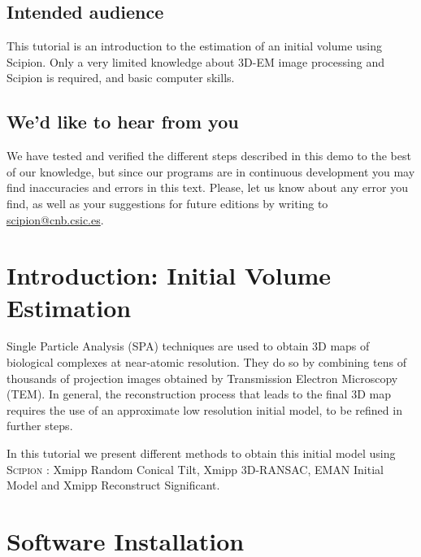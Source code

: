 \documentclass[12pt]{article} %
\newcommand{\scipion}{\textsc{Scipion} }
\begin{document}



\subsection*{Intended audience}

This tutorial is an introduction to the estimation of an initial
volume using Scipion.  Only a very limited knowledge about 3D-EM image
processing and Scipion is required, and basic computer skills.

\subsection*{We'd like to hear from you}

We have tested and verified the different steps described in this demo
to the best of our knowledge, but since our programs are in continuous
development you may find inaccuracies and errors in this text. Please,
let us know about any error you find, as well as your suggestions for
future editions by writing to
\href{mailto:scipion@cnb.csic.es}{scipion@cnb.csic.es}.

\newpage


\tableofcontents %

\newpage

\section{Introduction: Initial Volume Estimation}

Single Particle Analysis (SPA) techniques are used to obtain 3D maps
of biological complexes at near-atomic resolution. They do so by
combining tens of thousands of projection images obtained by
Transmission Electron Microscopy (TEM). In general, the reconstruction
process that leads to the final 3D map requires the use of an
approximate low resolution initial model, to be refined in further
steps.

In this tutorial we present different methods to obtain this initial
model using \scipion: Xmipp Random Conical Tilt, Xmipp 3D-RANSAC, EMAN
Initial Model and Xmipp Reconstruct Significant.

\section{Software Installation}
\end{document}
